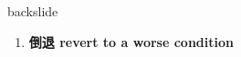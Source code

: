 
\begin{frame}
{\huge backslide}
\begin{center}
\begin{enumerate}\Large
  \item \textbf{倒退 revert to a worse condition}
\end{enumerate}
\end{center}
\end{frame}
